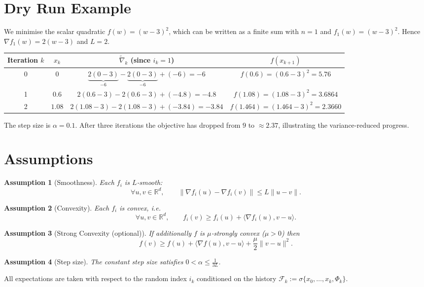 \documentclass{article}
\newtheorem{assumption}{Assumption}
\newcommand{\R}{\mathbb{R}}
\newcommand{\grad}{\nabla}
\newcommand{\inner}[2]{\langle #1,#2\rangle}
\begin{document}
\section*{Dry Run Example}
We minimise the scalar quadratic $f(w)=(w-3)^2$, which can be written as a finite sum with $n=1$ and $f_1(w)=(w-3)^2$.
Hence $ \grad f_1(w)=2(w-3) $ and $L=2$.

\begin{center}
\begin{tabular}{c|c|c|c}
Iteration $k$ & $x_k$ & $\tilde\nabla_k$ (since $i_k=1$) & $f(x_{k+1})$ \\ \hline
0 & $0$ & $\underbrace{2(0-3)}_{-6}-\underbrace{2(0-3)}_{-6}+(-6)= -6$ & $f(0.6)= (0.6-3)^2=5.76$\\
1 & $0.6$ & $2(0.6-3)-2(0.6-3)+(-4.8)= -4.8$ & $f(1.08)= (1.08-3)^2=3.6864$\\
2 & $1.08$ & $2(1.08-3)-2(1.08-3)+(-3.84)= -3.84$ & $f(1.464)= (1.464-3)^2=2.3660$\\
\end{tabular}
\end{center}
The step size is $\alpha=0.1$. After three iterations the objective has dropped from $9$ to $\approx2.37$, illustrating the variance‑reduced progress.

\newpage
\section*{Assumptions}
\begin{assumption}[Smoothness]\label{ass:smooth}
Each $f_i$ is $L$‑smooth:
\[
\forall u,v\in\R^d,\qquad 
\|\grad f_i(u)-\grad f_i(v)\|\le L\|u-v\|.
\tag{A1}
\]
\end{assumption}
\begin{assumption}[Convexity]\label{ass:convex}
Each $f_i$ is convex, i.e.
\[
\forall u,v\in\R^d,\qquad 
f_i(v)\ge f_i(u)+\inner{\grad f_i(u)}{v-u}.
\tag{A2}
\]
\end{assumption}
\begin{assumption}[Strong Convexity (optional)]\label{ass:strong}
If additionally $f$ is $\mu$‑strongly convex ($\mu>0$) then
\[
f(v)\ge f(u)+\inner{\grad f(u)}{v-u}+\frac{\mu}{2}\|v-u\|^2 .
\tag{A3}
\]
\end{assumption}
\begin{assumption}[Step size]\label{ass:stepsize}
The constant step size satisfies $0<\alpha\le \frac{1}{3L}$.
\end{assumption}

All expectations are taken with respect to the random index $i_k$ conditioned on the history $\mathcal{F}_k:=\sigma\{x_0,\dots ,x_k,\Phi_k\}$.
\end{document}
